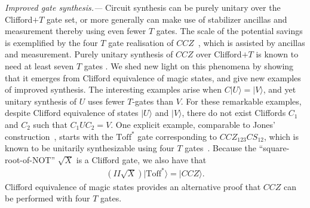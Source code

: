 \documentclass[aps,prl,twocolumn,showpacs,superscriptaddress,groupedaddress,amsmath,amssymb]{revtex4-1}  %
\def\ket #1{\vert #1\rangle}
\begin{document}
\noindent\textit{Improved gate synthesis.---}  Circuit synthesis can be purely unitary over the Clifford$+T$ gate set, or more generally can make use of stabilizer ancillas and measurement thereby using even fewer $T$ gates. The scale of the potential savings is exemplified by the four $T$ gate realisation of $CCZ$~\cite{jones_low-overhead_2013}, which is assisted by ancillas and measurement.  Purely unitary synthesis of $CCZ$ over Clifford$+T$ is known to need at least seven $T$ gates \cite{gosset_algorithm_2014}.  We shed new light on this phenomena by showing that it emerges from Clifford equivalence of magic states, and give new examples of improved synthesis.  The interesting examples arise when $C\ket{U}=\ket{V}$, and yet unitary synthesis of $U$ uses fewer $T$-gates than $V$.  For these remarkable examples, despite Clifford equivalence of states $\ket{U}$ and $\ket{V}$,  there do not exist Cliffords $C_1$ and $C_2$ such that $C_1 U C_2 = V$. One explicit example, comparable to Jones' construction~\cite{jones_low-overhead_2013}, starts with the $\mathrm{Toff}^*$ gate corresponding to $CCZ_{123}CS_{12}$, which is known to be unitarily synthesizable using four $T$ gates~\cite{selinger_quantum_2013}. Because the ``square-root-of-NOT'' $\sqrt{X}$ is a Clifford gate, we also have that
\begin{align}
    \left(II\sqrt{X}\right) \ket{\mathrm{Toff}^*}=\ket{CCZ}. \label{eqn:ToffCCZ}
\end{align}
Clifford equivalence of magic states provides an alternative proof that $CCZ$ can be performed with four $T$ gates.  
\end{document}
